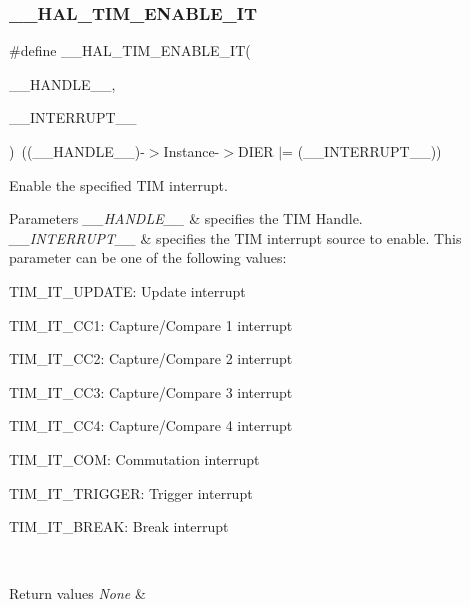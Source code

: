 \subsubsection{\texorpdfstring{\+\_\+\+\_\+\+H\+A\+L\+\_\+\+T\+I\+M\+\_\+\+E\+N\+A\+B\+L\+E\+\_\+\+IT}{\_\_HAL\_TIM\_ENABLE\_IT}}
{\footnotesize\ttfamily \#define \+\_\+\+\_\+\+H\+A\+L\+\_\+\+T\+I\+M\+\_\+\+E\+N\+A\+B\+L\+E\+\_\+\+IT(\begin{DoxyParamCaption}\item[{}]{\+\_\+\+\_\+\+H\+A\+N\+D\+L\+E\+\_\+\+\_\+,  }\item[{}]{\+\_\+\+\_\+\+I\+N\+T\+E\+R\+R\+U\+P\+T\+\_\+\+\_\+ }\end{DoxyParamCaption})~((\+\_\+\+\_\+\+H\+A\+N\+D\+L\+E\+\_\+\+\_\+)-\/$>$Instance-\/$>$D\+I\+ER $\vert$= (\+\_\+\+\_\+\+I\+N\+T\+E\+R\+R\+U\+P\+T\+\_\+\+\_\+))}



Enable the specified T\+IM interrupt. 


\begin{DoxyParams}{Parameters}
{\em \+\_\+\+\_\+\+H\+A\+N\+D\+L\+E\+\_\+\+\_\+} & specifies the T\+IM Handle. \\
\hline
{\em \+\_\+\+\_\+\+I\+N\+T\+E\+R\+R\+U\+P\+T\+\_\+\+\_\+} & specifies the T\+IM interrupt source to enable. This parameter can be one of the following values\+: \begin{DoxyItemize}
\item T\+I\+M\+\_\+\+I\+T\+\_\+\+U\+P\+D\+A\+TE\+: Update interrupt \item T\+I\+M\+\_\+\+I\+T\+\_\+\+C\+C1\+: Capture/\+Compare 1 interrupt \item T\+I\+M\+\_\+\+I\+T\+\_\+\+C\+C2\+: Capture/\+Compare 2 interrupt \item T\+I\+M\+\_\+\+I\+T\+\_\+\+C\+C3\+: Capture/\+Compare 3 interrupt \item T\+I\+M\+\_\+\+I\+T\+\_\+\+C\+C4\+: Capture/\+Compare 4 interrupt \item T\+I\+M\+\_\+\+I\+T\+\_\+\+C\+OM\+: Commutation interrupt \item T\+I\+M\+\_\+\+I\+T\+\_\+\+T\+R\+I\+G\+G\+ER\+: Trigger interrupt \item T\+I\+M\+\_\+\+I\+T\+\_\+\+B\+R\+E\+AK\+: Break interrupt \end{DoxyItemize}
\\
\hline
\end{DoxyParams}

\begin{DoxyRetVals}{Return values}
{\em None} & \\
\hline
\end{DoxyRetVals}
\mbox{\label{group___t_i_m___exported___macros_gaa7a5c7645695bad15bacd402513a028a}} 
